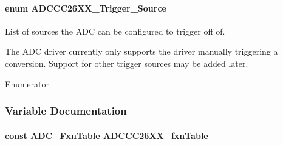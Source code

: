 \paragraph[{A\+D\+C\+C\+C26\+X\+X\+\_\+\+Trigger\+\_\+\+Source}]{\setlength{\rightskip}{0pt plus 5cm}enum {\bf A\+D\+C\+C\+C26\+X\+X\+\_\+\+Trigger\+\_\+\+Source}}\label{_a_d_c_c_c26_x_x_8h_ac122319c50b5f443f4d3254a2b2d58f0}


List of sources the A\+D\+C can be configured to trigger off of. 

The A\+D\+C driver currently only supports the driver manually triggering a conversion. Support for other trigger sources may be added later. \begin{Desc}
\item[Enumerator]\par
\begin{description}
\item[{\em 
A\+D\+C\+C\+C26\+X\+X\+\_\+\+T\+R\+I\+G\+G\+E\+R\+\_\+\+M\+A\+N\+U\+A\+L\label{_a_d_c_c_c26_x_x_8h_ac122319c50b5f443f4d3254a2b2d58f0aafe64b4149875b946350262169812030}
}]\end{description}
\end{Desc}


\subsubsection{Variable Documentation}
\paragraph[{A\+D\+C\+C\+C26\+X\+X\+\_\+fxn\+Table}]{\setlength{\rightskip}{0pt plus 5cm}const {\bf A\+D\+C\+\_\+\+Fxn\+Table} A\+D\+C\+C\+C26\+X\+X\+\_\+fxn\+Table}\label{_a_d_c_c_c26_x_x_8h_a4e18261700c8a99141f2507c54c13227}
